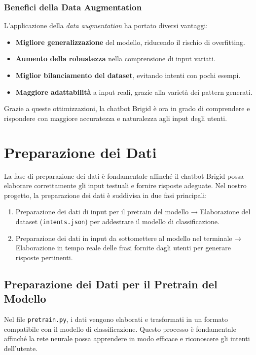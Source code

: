 \documentclass[12pt, letterpaper]{article}
\begin{document}
\subsubsection{Benefici della Data Augmentation}
L’applicazione della \textit{data augmentation} ha portato diversi vantaggi:
\begin{itemize}
	\item \textbf{Migliore generalizzazione} del modello, riducendo il rischio di overfitting.
	\item \textbf{Aumento della robustezza} nella comprensione di input variati.
	\item \textbf{Miglior bilanciamento del dataset}, evitando intenti con pochi esempi.
	\item \textbf{Maggiore adattabilità} a input reali, grazie alla varietà dei pattern generati.
\end{itemize}
Grazie a queste ottimizzazioni, la chatbot Brigid è ora in grado di comprendere e rispondere con maggiore accuratezza e naturalezza agli input degli utenti.


\section{Preparazione dei Dati}

La fase di preparazione dei dati è fondamentale affinché il chatbot Brigid possa elaborare correttamente gli input testuali e fornire risposte adeguate. Nel nostro progetto, la preparazione dei dati è suddivisa in due fasi principali:

\begin{enumerate}
	\item Preparazione dei dati di input per il pretrain del modello → Elaborazione del dataset (\texttt{intents.json}) per addestrare il modello di classificazione.
	\item Preparazione dei dati in input da sottomettere al modello nel terminale → Elaborazione in tempo reale delle frasi fornite dagli utenti per generare risposte pertinenti.
\end{enumerate}

\subsection{Preparazione dei Dati per il Pretrain del Modello}

Nel file \texttt{pretrain.py}, i dati vengono elaborati e trasformati in un formato compatibile con il modello di classificazione. Questo processo è fondamentale affinché la rete neurale possa apprendere in modo efficace e riconoscere gli intenti dell’utente.
\end{document}
